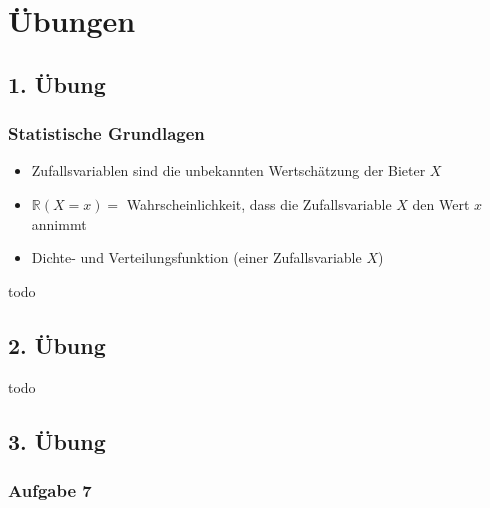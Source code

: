 \documentclass[12pt]{extreport} %
\theoremstyle{named}
\theoremstyle{itshape}
\theoremstyle{normal}
\begin{document}
\newpage

 \appendix {}  

\chapter*{Übungen}


\section*{1. Übung}

\subsection*{Statistische Grundlagen}

\begin{itemize}
	\item Zufallsvariablen sind die unbekannten Wertschätzung der Bieter $X$
	\item $\mathbb{R}(X = x) =$ Wahrscheinlichkeit, dass die Zufallsvariable $X$ den Wert $x$ annimmt
	\item Dichte- und Verteilungsfunktion (einer Zufallsvariable $X$)
\end{itemize}

todo

\newpage

\section*{2. Übung}
 todo

\newpage

\section*{3. Übung}

\subsection*{Aufgabe 7}
\end{document}
